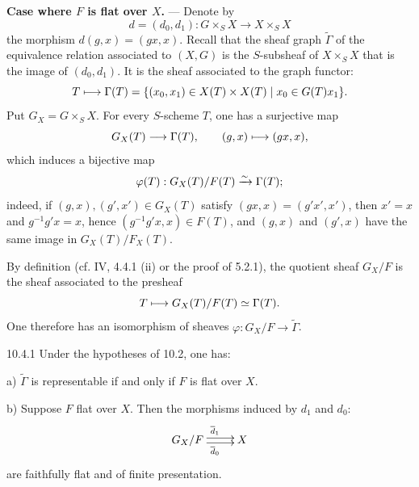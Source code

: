 \textbf{Case where $F$ is flat over $X$.} --- Denote by
\[
d=(d_0,d_1):G\times_SX\to X\times_SX
\]
the morphism $d(g,x)=(gx,x)$. Recall that the sheaf graph $\widetilde\Gamma$ of the equivalence relation associated to $(X,G)$ is the \fppf $S$-subsheaf of $X\times_SX$ that is the image of $(d_0,d_1)$. It is the \fppf sheaf associated to the graph functor:
\[
T\longmapsto\Gamma(T)=\{(x_0,x_1)\in X(T)\times X(T)\mid x_0\in G(T)x_1\}.
\]
Put $G_X=G\times_SX$. For every $S$-scheme $T$, one has a surjective map
\[
G_X(T)\longrightarrow\Gamma(T),\qquad(g,x)\longmapsto(gx,x),
\]
which induces a bijective map
\[
\varphi(T):G_X(T)/F(T)\xrightarrow{\sim}\Gamma(T);
\]
indeed, if $(g,x),(g',x')\in G_X(T)$ satisfy $(gx,x)=(g'x',x')$, then $x'=x$ and $g^{-1}g'x=x$, hence $(g^{-1}g'x,x)\in F(T)$, and $(g,x)$ and $(g',x)$ have the same image in $G_X(T)/F_X(T)$.

By definition (cf. IV, 4.4.1 (ii) or the proof of 5.2.1), the quotient sheaf $G_X/F$ is the \fppf sheaf associated to the presheaf
\[
T\longmapsto G_X(T)/F(T)\simeq\Gamma(T).
\]
One therefore has an isomorphism of sheaves $\varphi:G_X/F\to\widetilde\Gamma$.
\begin{theorem}{10.4.1}\label{V.10.4.1}
Under the hypotheses of 10.2, one has:

\textup{a)} $\widetilde\Gamma$ is representable if and only if $F$ is flat over $X$.

\textup{b)} Suppose $F$ flat over $X$. Then the morphisms induced by $d_1$ and $d_0$:
\[
\xymatrix{G_X/F\ar@<.5ex>[r]^{\overline d_1}\ar@<-.5ex>[r]_{\overline d_0}&X}
\]
are faithfully flat and of finite presentation.
\end{theorem}

